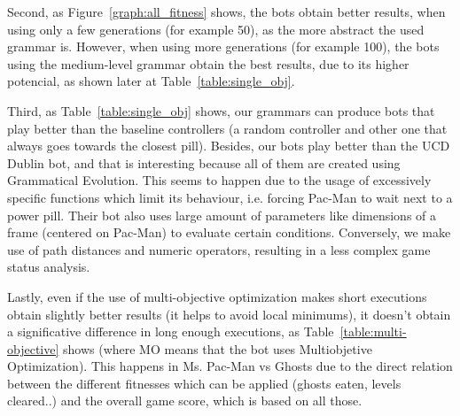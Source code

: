 Second, as Figure~\ref{graph:all_fitness} shows, the bots obtain better results, when using only a few generations (for example 50), as the more abstract the used grammar is. However, when using more generations (for example 100), the bots using the medium-level grammar obtain the best results, due to its higher potencial, as shown later at Table~\ref{table:single_obj}.
 
Third, as Table~\ref{table:single_obj} shows, our grammars can produce bots that play better than the baseline controllers (a random controller and other one that always goes towards the closest pill). Besides, our bots play better than the UCD Dublin bot\cite{galvan2010evolving}, and that is interesting because all of them are created using Grammatical Evolution. This seems to happen due to the usage of excessively specific functions which limit its behaviour, i.e. forcing Pac-Man to wait next to a power pill. Their bot also uses large amount of parameters like dimensions of a frame (centered on Pac-Man) to evaluate certain conditions. Conversely, we make use of path distances and numeric operators, resulting in a less complex game status analysis.

Lastly, even if the use of multi-objective optimization makes short executions obtain slightly better results (it helps to avoid local minimums), it doesn’t obtain a significative difference in long enough executions, as Table~\ref{table:multi-objective} shows (where MO means that the bot uses Multiobjetive Optimization). This happens in Ms. Pac-Man vs Ghosts due to the direct relation between the different fitnesses which can be applied (ghosts eaten, levels cleared..) and the overall game score, which is based on all those.
